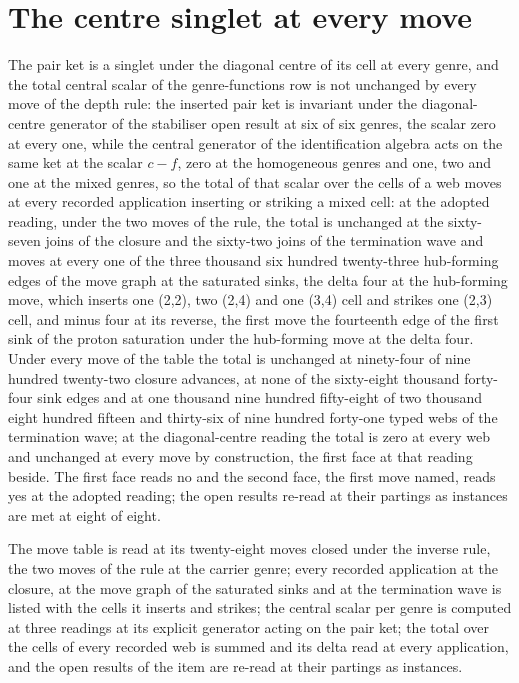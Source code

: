 \section{The centre singlet at every move}\label{mod:I-4-D543514-w-csng}
\begin{chwall}\label{box:I-4-D543514-w-csng:1}
The pair ket is a singlet under the diagonal centre of its cell at every genre, and the total central scalar of the genre-functions row is not unchanged by every move of the depth rule: the inserted pair ket is invariant under the diagonal-centre generator of the stabiliser open result at six of six genres, the scalar zero at every one, while the central generator of the identification algebra acts on the same ket at the scalar $c - f$, zero at the homogeneous genres and one, two and one at the mixed genres, so the total of that scalar over the cells of a web moves at every recorded application inserting or striking a mixed cell: at the adopted reading, under the two moves of the rule, the total is unchanged at the sixty-seven joins of the closure and the sixty-two joins of the termination wave and moves at every one of the three thousand six hundred twenty-three hub-forming edges of the move graph at the saturated sinks, the delta four at the hub-forming move, which inserts one (2,2), two (2,4) and one (3,4) cell and strikes one (2,3) cell, and minus four at its reverse, the first move the fourteenth edge of the first sink of the proton saturation under the hub-forming move at the delta four. Under every move of the table the total is unchanged at ninety-four of nine hundred twenty-two closure advances, at none of the sixty-eight thousand forty-four sink edges and at one thousand nine hundred fifty-eight of two thousand eight hundred fifteen and thirty-six of nine hundred forty-one typed webs of the termination wave; at the diagonal-centre reading the total is zero at every web and unchanged at every move by construction, the first face at that reading beside. The first face reads no and the second face, the first move named, reads yes at the adopted reading; the open results re-read at their partings as instances are met at eight of eight.
\end{chwall}
The move table is read at its twenty-eight moves closed under the inverse rule, the two moves of the rule at the carrier genre; every recorded application at the closure, at the move graph of the saturated sinks and at the termination wave is listed with the cells it inserts and strikes; the central scalar per genre is computed at three readings at its explicit generator acting on the pair ket; the total over the cells of every recorded web is summed and its delta read at every application, and the open results of the item are re-read at their partings as instances.

